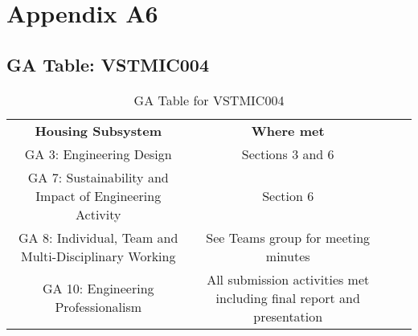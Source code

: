 \documentclass[class=report,11pt,crop=false]{standalone}
\begin{document}
	\chapter{Appendix A6}
	\section{GA Table: VSTMIC004}
	\begin{table}
		\centering
		\caption{GA Table for VSTMIC004}
		\begin{tabular}{cccc}
			\textbf{Housing Subsystem}                              & \textbf{Where met}                                                    \\
			GA 3: Engineering Design                                & Sections 3 and 6                                                      \\
			GA 7: Sustainability and Impact of Engineering Activity & Section 6                                                             \\
			GA 8: Individual, Team and Multi-Disciplinary Working   & See Teams group for meeting minutes                                   \\
			GA 10: Engineering Professionalism                      & All submission activities met including final report and presentation 
		\end{tabular}
		
	\end{table}
	\ifstandalone
	
	\printnoidxglossary[type=\acronymtype,nonumberlist]
	\fi
\end{document}
